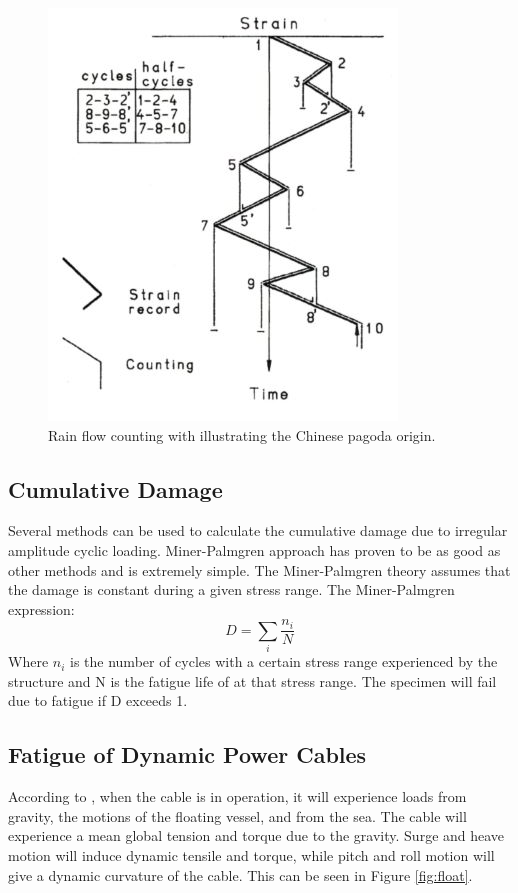 \begin{figure}[H]
\centering
\includegraphics[scale=0.9]{figures/pagoda}
\caption[$\; \:$Rain flow counting]{Rain flow counting with illustrating the Chinese pagoda origin.    \cite{fatigue2016} }
 \label{fig:pagoda}
\end{figure}

\subsection{Cumulative Damage}
Several methods can be used to calculate the cumulative damage due to irregular amplitude cyclic loading. Miner-Palmgren approach has proven to be as good as other methods and is extremely simple. The Miner-Palmgren theory assumes that the damage is constant during a given stress range. The Miner-Palmgren expression:
\begin{equation}
    D=\sum_i \frac{n_i}{N} 
    \label{eq:MP}
\end{equation}
Where $n_i$ is the number of cycles with a certain stress range experienced by the structure and N is the fatigue life of at that stress range.\newline
\newline
The specimen will fail due to fatigue if D exceeds 1.

\subsection{Fatigue of Dynamic Power Cables}
\noindent According to \cite{Nasution2013}, when the cable is in operation, it will experience loads from gravity, the motions of the floating vessel, and from the sea. The cable will experience a mean global tension and torque due to the gravity. Surge and heave motion will induce dynamic tensile and torque, while pitch and roll motion will give a dynamic curvature of the cable. This can be seen in Figure \ref{fig:float}. 

